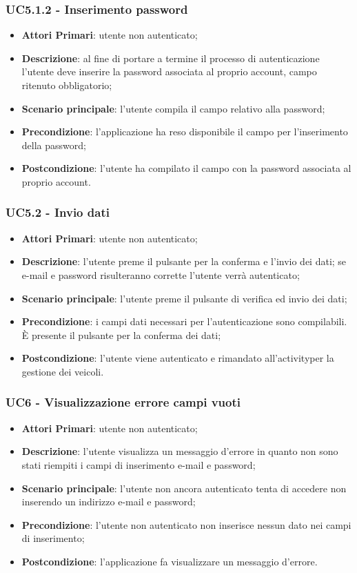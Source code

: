 \subsubsection{UC5.1.2 - Inserimento password}
\begin{itemize}
	\item \textbf{Attori Primari}: utente non autenticato;
	\item \textbf{Descrizione}: al fine di portare a termine il processo di autenticazione l'utente deve inserire la password associata al proprio account, campo ritenuto obbligatorio;
	\item \textbf{Scenario principale}: l'utente compila il campo relativo alla password;	
	\item \textbf{Precondizione}: l'applicazione ha reso disponibile il campo per l'inserimento della password;
	\item \textbf{Postcondizione}: l'utente ha compilato il campo con la password associata al proprio account.
\end{itemize}

\subsubsection{UC5.2 - Invio dati}
\begin{itemize}
	\item \textbf{Attori Primari}: utente non autenticato;
	\item \textbf{Descrizione}: l'utente preme il pulsante per la conferma e l'invio dei dati; se e-mail e password risulteranno corrette l'utente verrà autenticato;
	\item \textbf{Scenario principale}: l'utente preme il pulsante di verifica ed invio dei dati;	
	\item \textbf{Precondizione}: i campi dati necessari per l'autenticazione sono compilabili. È presente il pulsante per la conferma dei dati;
	\item \textbf{Postcondizione}: l'utente viene autenticato e rimandato all'activity\glosp per la gestione dei veicoli.
\end{itemize}

\subsubsection{UC6 - Visualizzazione errore campi vuoti}
\begin{itemize}
	\item \textbf{Attori Primari}: utente non autenticato;
	\item \textbf{Descrizione}: l'utente visualizza un messaggio d'errore in quanto non sono stati riempiti i campi di inserimento e-mail e password;
	\item \textbf{Scenario principale}: l'utente non ancora autenticato tenta di accedere non inserendo un indirizzo e-mail e password;	
	\item \textbf{Precondizione}: l'utente non autenticato non inserisce nessun dato nei campi di inserimento;
	\item \textbf{Postcondizione}: l'applicazione fa visualizzare un messaggio d'errore.
\end{itemize}
